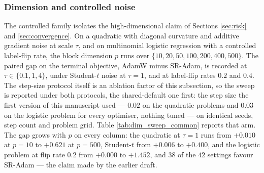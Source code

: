 \documentclass[a4paper,fleqn]{cas-dc}
\theoremstyle{plain}
\theoremstyle{definition}
\theoremstyle{remark}
\begin{document}
\subsubsection{Dimension and controlled noise}

The controlled family isolates the high-dimensional claim of Sections \ref{sec:risk} and \ref{sec:convergence}. On a quadratic with diagonal curvature and additive gradient noise at scale $\tau$, and on multinomial logistic regression with a controlled label-flip rate, the block dimension $p$ runs over $\{10,20,50,100,200,400,500\}$. The paired gap on the terminal objective, AdamW minus SR-Adam, is recorded at $\tau\in\{0.1,1,4\}$, under Student-$t$ noise at $\tau=1$, and at label-flip rates $0.2$ and $0.4$. The step-size protocol itself is an ablation factor of this subsection, so the sweep is reported under both protocols, the shared-default one first: the step size the first version of this manuscript used --- $0.02$ on the quadratic problems and $0.03$ on the logistic problem for every optimiser, nothing tuned --- on identical seeds, step count and problem grid. Table \ref{tab:dim_sweep_common} reports that arm. The gap grows with $p$ on every column: the quadratic at $\tau=1$ runs from $+0.010$ at $p=10$ to $+0.621$ at $p=500$, Student-$t$ from $+0.006$ to $+0.400$, and the logistic problem at flip rate $0.2$ from $+0.000$ to $+1.452$, and $38$ of the $42$ settings favour SR-Adam --- the claim made by the earlier draft.
\end{document}
